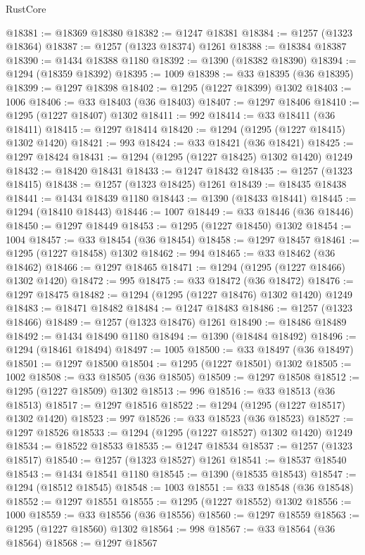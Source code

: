 \begin{lexlean}{RustCore}
\begin{coremodule}
@18381 := @18369 @18380
@18382 := @1247 @18381
@18384 := @1257 (@1323 @18364)
@18387 := @1257 (@1323 @18374) @1261
@18388 := @18384 @18387
@18390 := @1434 @18388 @1180
@18392 := @1390 (@18382 @18390)
@18394 := @1294 (@18359 @18392)
@18395 := 1009
@18398 := @33 @18395 (@36 @18395)
@18399 := @1297 @18398
@18402 := @1295 (@1227 @18399) @1302
@18403 := 1006
@18406 := @33 @18403 (@36 @18403)
@18407 := @1297 @18406
@18410 := @1295 (@1227 @18407) @1302
@18411 := 992
@18414 := @33 @18411 (@36 @18411)
@18415 := @1297 @18414
@18420 := @1294 (@1295 (@1227 @18415) @1302 @1420)
@18421 := 993
@18424 := @33 @18421 (@36 @18421)
@18425 := @1297 @18424
@18431 := @1294 (@1295 (@1227 @18425) @1302 @1420) @1249
@18432 := @18420 @18431
@18433 := @1247 @18432
@18435 := @1257 (@1323 @18415)
@18438 := @1257 (@1323 @18425) @1261
@18439 := @18435 @18438
@18441 := @1434 @18439 @1180
@18443 := @1390 (@18433 @18441)
@18445 := @1294 (@18410 @18443)
@18446 := 1007
@18449 := @33 @18446 (@36 @18446)
@18450 := @1297 @18449
@18453 := @1295 (@1227 @18450) @1302
@18454 := 1004
@18457 := @33 @18454 (@36 @18454)
@18458 := @1297 @18457
@18461 := @1295 (@1227 @18458) @1302
@18462 := 994
@18465 := @33 @18462 (@36 @18462)
@18466 := @1297 @18465
@18471 := @1294 (@1295 (@1227 @18466) @1302 @1420)
@18472 := 995
@18475 := @33 @18472 (@36 @18472)
@18476 := @1297 @18475
@18482 := @1294 (@1295 (@1227 @18476) @1302 @1420) @1249
@18483 := @18471 @18482
@18484 := @1247 @18483
@18486 := @1257 (@1323 @18466)
@18489 := @1257 (@1323 @18476) @1261
@18490 := @18486 @18489
@18492 := @1434 @18490 @1180
@18494 := @1390 (@18484 @18492)
@18496 := @1294 (@18461 @18494)
@18497 := 1005
@18500 := @33 @18497 (@36 @18497)
@18501 := @1297 @18500
@18504 := @1295 (@1227 @18501) @1302
@18505 := 1002
@18508 := @33 @18505 (@36 @18505)
@18509 := @1297 @18508
@18512 := @1295 (@1227 @18509) @1302
@18513 := 996
@18516 := @33 @18513 (@36 @18513)
@18517 := @1297 @18516
@18522 := @1294 (@1295 (@1227 @18517) @1302 @1420)
@18523 := 997
@18526 := @33 @18523 (@36 @18523)
@18527 := @1297 @18526
@18533 := @1294 (@1295 (@1227 @18527) @1302 @1420) @1249
@18534 := @18522 @18533
@18535 := @1247 @18534
@18537 := @1257 (@1323 @18517)
@18540 := @1257 (@1323 @18527) @1261
@18541 := @18537 @18540
@18543 := @1434 @18541 @1180
@18545 := @1390 (@18535 @18543)
@18547 := @1294 (@18512 @18545)
@18548 := 1003
@18551 := @33 @18548 (@36 @18548)
@18552 := @1297 @18551
@18555 := @1295 (@1227 @18552) @1302
@18556 := 1000
@18559 := @33 @18556 (@36 @18556)
@18560 := @1297 @18559
@18563 := @1295 (@1227 @18560) @1302
@18564 := 998
@18567 := @33 @18564 (@36 @18564)
@18568 := @1297 @18567

\end{coremodule}
\end{lexlean}
